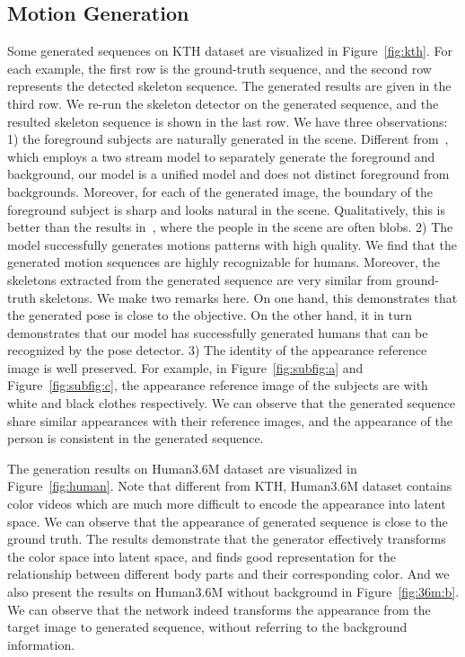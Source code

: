 \documentclass[journal]{IEEEtran}
\begin{document}
\subsection{Motion Generation}
Some generated sequences on KTH dataset are visualized in Figure~\ref{fig:kth}. For each example, the first row is the ground-truth sequence, and the second row represents the detected skeleton sequence. The generated results are given in the third row. We re-run the skeleton detector on the generated sequence, and the resulted skeleton sequence is shown in the last row.
We have three observations: 1) the foreground subjects are naturally generated in the scene. Different from~\cite{DBLP:conf/nips/VondrickPT16}, which employs a two stream model to separately generate the foreground and background, our model is a unified model and does not distinct foreground from backgrounds. Moreover, for each of the generated image, the boundary of the foreground subject is sharp and looks natural in the scene. Qualitatively, this is better than the results in~\cite{DBLP:conf/nips/VondrickPT16}, where the people in the scene are often blobs.
2) The model successfully generates motions patterns with high quality. We find that the generated motion sequences are highly recognizable for humans. Moreover, the skeletons extracted from the generated sequence are very similar from ground-truth skeletons. We make two remarks here. On one hand, this demonstrates that the generated pose is close to the objective. On the other hand, it in turn demonstrates that our model has successfully generated humans that can be recognized by the pose detector.
3) The identity of the appearance reference image is well preserved. For example, in Figure~\ref{fig:subfig:a} and Figure~\ref{fig:subfig:c}, the appearance reference image of the subjects are with white and black clothes respectively.
We can observe that the generated sequence share similar appearances with their reference images, and the appearance of the person is consistent in the generated sequence.

The generation results on Human3.6M dataset are visualized in Figure~\ref{fig:human}. Note that different from KTH, Human3.6M dataset contains color videos which are much more difficult to encode the appearance into latent space. We can observe that the appearance of generated sequence is close to the ground truth. The results demonstrate that the generator effectively transforms the color space into latent space, and finds good representation for the relationship between different body parts and their corresponding color. And we also present the results on Human3.6M without background in Figure~\ref{fig:36m:b}. We can observe that the network indeed transforms the appearance from the target image to generated sequence, without referring to the background information.
\end{document}
